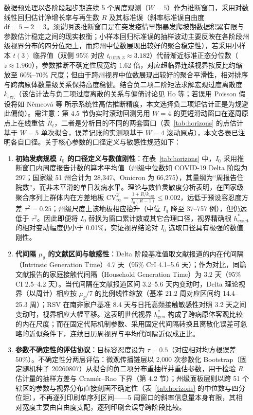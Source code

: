 \documentclass[11pt,a4paper]{article}
\theoremstyle{plain}
\theoremstyle{definition}
\begin{document}
数据预处理以各阶段起步期连续 5 个周度观测（$W=5$）作为推断窗口，采用对数线性回归估计净增长率与再生数 $R$ 及其标准误（斜率标准误自由度 $\text{df}=5-2=3$。须说明该推断窗口是在突发疫情早期暴发爬坡期数据积累有限与参数估计稳定之间的现实权衡；小样本回归标准误的抽样波动主要反映在各阶段州级视界分布的四分位距上，而跨州中位数展现出较好的聚合稳定性），若采用小样本 $t(3)$ 临界值（双侧 95\% 对应 $t_{0.025, 3} \approx 3.182$）代替渐近标准正态分位数（$z \approx 1.960$），参数推断不确定性展宽约 1.62 倍，对应超临界连续视界按反比约缩放至 60\%--70\% 尺度；但由于跨州视界中位数展现出较好的聚合平滑性，相对排序与跨病原体数量级关系保持高度稳健。结合负二项二阶矩法求解宏观过度离散度 $k_{\text{agg}}$（该估计法与负二项过度离散的关系与偏倚讨论见 Ho 等\citep{ho2023simultaneous}；若误用 Poisson 假设将如 Němcová 等\citep{nemcova2026unjustified} 所示系统性高估推断精度，本文选择负二项矩估计正是为规避此偏倚）。需注意：第 4.5 节伪实时滚动回测另用 $W=4$ 的更短滑动窗口在逐周原点上在线重估 $\hat{R}_t$，二者是分析目的不同的两套窗口（表~\ref{tab:horizons} 的点估计基于 $W=5$ 单次拟合，误差记账的实测项基于 $W=4$ 滚动原点），本文各表已注明各自口径。关于核心参数的口径定义与敏感性规范如下：
\begin{enumerate}
\item \textbf{初始发病规模 $I_0$ 的口径定义与数值刚性}：在表~\ref{tab:horizons} 中，$I_0$ 采用推断窗口内周度报告计数的算术平均值（州级中位数如 COVID-19 Delta 阶段为 297；国家级 51 州合计为 28,347、Omicron 为 66,275），其量纲为“周报告住院数”，而非未平滑的单日发病水平。理论与数值灵敏度分析表明，在国家级聚合序列上群体内在方差地板 $\text{CV}_\infty^2 = \frac{1+R/k_{\text{agg}}}{I_0(R-1)} \le 0.002$，远低于预设容忍度方差 $\tau^2 = 0.25$；州级尺度上该地板相应抬升（中位 $I_0$ 降至 37--757 例），但仍远低于 $\tau^2$。因此即便将 $I_0$ 替换为窗口累计数或其它合理口径，视界精确根 $h^*_{\text{exact}}$ 的相对变动幅度仍小于 0.01\%，实证视界结论对 $I_0$ 选取口径具有极强的数值刚性。
\item \textbf{代间隔 $\mu_g$ 的文献区间与敏感性}：Delta 阶段基准值取文献报道的内在代间隔（Intrinsic Generation Time）4.7 天（95\% CrI 4.1--5.6 天）\citep{hart2022generation}；作为对比，同篇文献报告的家庭接触代间隔（Household Generation Time）为 3.2 天（95\% CI 2.5--4.2 天）。当代间隔在文献报道区间 3.2--5.6 天内变动时，Delta 理论视界（以周计）相应按 $\mu_g/7$ 的比例线性缩放（基准 21.2 周对应区间约 14.4--25.3 周）；RSV 在南非家户基准 8.4 天\citep{cohen2024respiratory}与日托高频接触敏感性对照 3.2 天之间变动时，视界相应大幅平移。这表明世代视界 $h^*_{\text{gen}}$ 构成了跨病原体客观比较的内在尺度；而在固定代际机制参数、采用固定代间隔转换且离散化误差可忽略的近似条件下，连续日历周视界与平均代间隔近似成正比。
\item \textbf{参数不确定性的评估协议}：目标容忍度设为 $\tau = 0.5$（对应相对均方根误差 50\%）。不确定性分两层评估：微观传播链层以 2,000 次参数化 Bootstrap（固定随机种子 20260807）从拟合的负二项分布重抽样并重估参数，用于检验 $R$ 估计量的抽样方差与 Cram\'er--Rao 下界（第 4.2 节）；州级面板层则以跨 51 个辖区的参数与视界分布直接刻画不确定性（表~\ref{tab:horizons} 的中位数与四分位距），不再逐列印刷单序列区间——5 周窗口的斜率信息量本身有限，其相对宽度主要由自由度支配，逐列印刷会误导跨阶段比较。
\end{enumerate}
\end{document}
